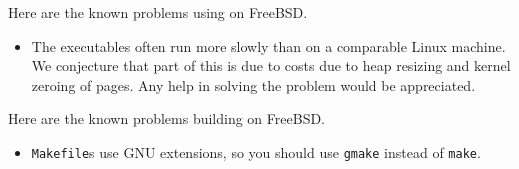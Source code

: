 
Here are the known problems using {\mlton} on FreeBSD.

\begin{itemize}

\item
The executables often run more slowly than on a comparable Linux
machine.  We conjecture that part of this is due to costs due to heap
resizing and kernel zeroing of pages.  Any help in solving the problem
would be appreciated.

\end{itemize}
Here are the known problems building {\mlton} on FreeBSD.

\begin{itemize}

\item {\mlton} {\tt Makefile}s use GNU extensions, so you should use {\tt gmake}
instead of {\tt make}.

\end{itemize}
